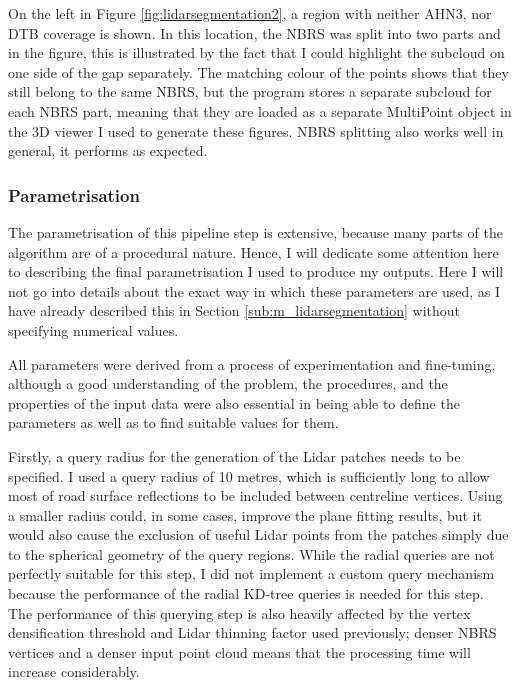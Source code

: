 On the left in Figure \ref{fig:lidarsegmentation2}, a region with neither AHN3, nor DTB coverage is shown. In this location, the NBRS was split into two parts and in the figure, this is illustrated by the fact that I could highlight the subcloud on one side of the gap separately. The matching colour of the points shows that they still belong to the same NBRS, but the program stores a separate subcloud for each NBRS part, meaning that they are loaded as a separate MultiPoint object in the 3D viewer I used to generate these figures. NBRS splitting also works well in general, it performs as expected.

\subsubsection{Parametrisation}

The parametrisation of this pipeline step is extensive, because many parts of the algorithm are of a procedural nature. Hence, I will dedicate some attention here to describing the final parametrisation I used to produce my outputs. Here I will not go into details about the exact way in which these parameters are used, as I have already described this in Section \ref{sub:m_lidarsegmentation} without specifying numerical values.

All parameters were derived from a process of experimentation and fine-tuning, although a good understanding of the problem, the procedures, and the properties of the input data were also essential in being able to define the parameters as well as to find suitable values for them.

Firstly, a query radius for the generation of the Lidar patches needs to be specified. I used a query radius of 10 metres, which is sufficiently long to allow most of road surface reflections to be included between centreline vertices. Using a smaller radius could, in some cases, improve the plane fitting results, but it would also cause the exclusion of useful Lidar points from the patches simply due to the spherical geometry of the query regions. While the radial queries are not perfectly suitable for this step, I did not implement a custom query mechanism because the performance of the radial KD-tree queries is needed for this step. The performance of this querying step is also heavily affected by the vertex densification threshold and Lidar thinning factor used previously; denser NBRS vertices and a denser input point cloud means that the processing time will increase considerably.


